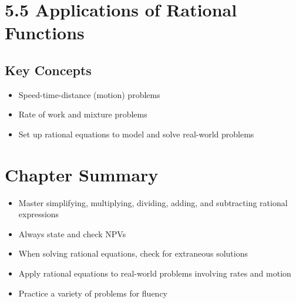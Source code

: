 \documentclass[12pt]{article}
\begin{document}
\section{5.5 Applications of Rational Functions}
\subsection*{Key Concepts}
\begin{tcolorbox}[colback=lightgray,colframe=primary,title=Applications]
    \begin{itemize}
        \item Speed-time-distance (motion) problems
        \item Rate of work and mixture problems
        \item Set up rational equations to model and solve real-world problems
    \end{itemize}
\end{tcolorbox}

\section*{Chapter Summary}
\begin{tcolorbox}[colback=lightgray,colframe=primary,title=Key Takeaways]
    \begin{itemize}
        \item Master simplifying, multiplying, dividing, adding, and subtracting rational expressions
        \item Always state and check NPVs
        \item When solving rational equations, check for extraneous solutions
        \item Apply rational equations to real-world problems involving rates and motion
        \item Practice a variety of problems for fluency
    \end{itemize}
\end{tcolorbox}
\end{document}
